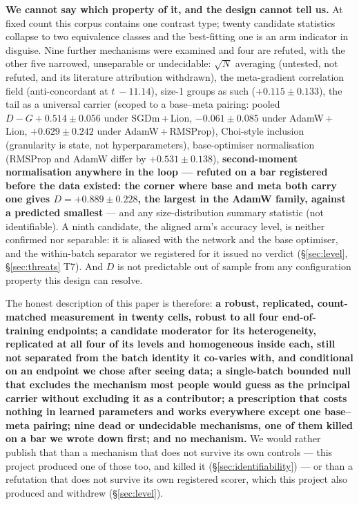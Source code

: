 \documentclass[10pt,letterpaper]{article}
\newcommand{\Dstat}{D}                         %
\newcommand{\Gstat}{G}                         %
\begin{document}
\textbf{We cannot say which property of it, and the design cannot tell us.} At fixed count this
corpus contains one contrast type; twenty candidate statistics collapse to two equivalence classes
and the best-fitting one is an arm indicator in disguise. Nine further mechanisms were examined and
four are refuted, with the other five narrowed, unseparable or undecidable: $\sqrt{N}$ averaging
(untested, not refuted, and its literature attribution withdrawn), the meta-gradient correlation
field (anti-concordant at $t\ -11.14$), size-1 groups as such ($+0.115 \pm 0.133$), the tail as a
universal carrier (scoped to a base--meta pairing: pooled $\Dstat - \Gstat +0.514 \pm 0.056$ under
SGDm\,+\,Lion, $-0.061 \pm 0.085$ under AdamW\,+\,Lion, $+0.629 \pm 0.242$ under
AdamW\,+\,RMSProp), Choi-style inclusion (granularity is state, not hyperparameters),
base-optimiser normalisation (RMSProp and AdamW differ by $+0.531 \pm 0.138$),
\textbf{second-moment normalisation anywhere in the loop --- refuted on a bar registered before the
data existed: the corner where base and meta both carry one gives $\Dstat = +0.889 \pm 0.228$, the
largest in the AdamW family, against a predicted smallest} --- and any
size-distribution summary statistic (not identifiable). A ninth candidate, the aligned arm's
accuracy level, is neither confirmed nor separable: it is aliased with the network and the base
optimiser, and the within-batch separator we registered for it issued no verdict
(\S\ref{sec:level}, \S\ref{sec:threats} T7). And $\Dstat$ is not predictable out of sample from any
configuration property this design can resolve.

The honest description of this paper is therefore: \textbf{a robust, replicated, count-matched
measurement in twenty cells, robust to all four end-of-training endpoints; a candidate moderator
for its heterogeneity, replicated at all four of
its levels and homogeneous inside each, still not separated from the batch identity it
co-varies with, and conditional on an endpoint we chose after seeing data;
a single-batch bounded null that excludes the mechanism most people would guess as
the principal carrier without excluding it as a contributor; a prescription that costs nothing in
learned parameters and works everywhere except one base--meta pairing; nine dead or undecidable
mechanisms, one of them killed on a bar we wrote down first; and no mechanism.} We would rather publish that than a
mechanism that does not survive its own controls --- this project produced one of those too, and
killed it (\S\ref{sec:identifiability}) --- or than a refutation that does not survive its own
registered scorer, which this project also produced and withdrew (\S\ref{sec:level}).
\end{document}
